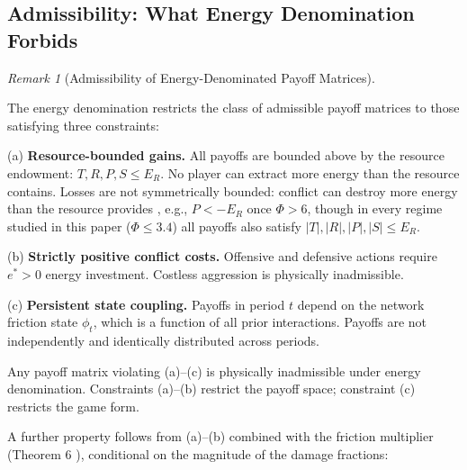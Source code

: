 \documentclass[11pt]{article}
\theoremstyle{plain}
\theoremstyle{definition}
\theoremstyle{remark}
\newtheorem{remark}{Remark}
\let\origsubsection\subsection
\renewcommand{\subsection}{\needspace{7\baselineskip}\origsubsection}
\begin{document}
\subsection{Admissibility: What Energy Denomination
Forbids}\label{admissibility-what-energy-denomination-forbids}

\begin{remark}[Admissibility of Energy-Denominated Payoff Matrices]
\label{rmk-admissibility}

The energy denomination restricts the class of admissible payoff matrices to those satisfying three constraints:

(a) \textbf{Resource-bounded gains.} All payoffs are bounded above by the resource endowment: $T, R, P, S \leq E_R$. No player can extract more energy than the resource contains. Losses are not symmetrically bounded: conflict can destroy more energy than the resource provides \citep{TC-IV}, e.g., $P < -E_R$ once $\Phi > 6$, though in every regime studied in this paper ($\Phi \leq 3.4$) all payoffs also satisfy $|T|, |R|, |P|, |S| \leq E_R$.

(b) \textbf{Strictly positive conflict costs.} Offensive and defensive actions require $e^* > 0$ energy investment. Costless aggression is physically inadmissible.

(c) \textbf{Persistent state coupling.} Payoffs in period $t$ depend on the network friction state $\phi_t$, which is a function of all prior interactions. Payoffs are not independently and identically distributed across periods.

Any payoff matrix violating (a)–(c) is physically inadmissible under energy denomination. Constraints (a)–(b) restrict the payoff space; constraint (c) restricts the game form.

A further property follows from (a)–(b) combined with the friction multiplier (Theorem 6 \citep{TC-IV}), conditional on the magnitude of the damage fractions:


\end{remark}
\end{document}
